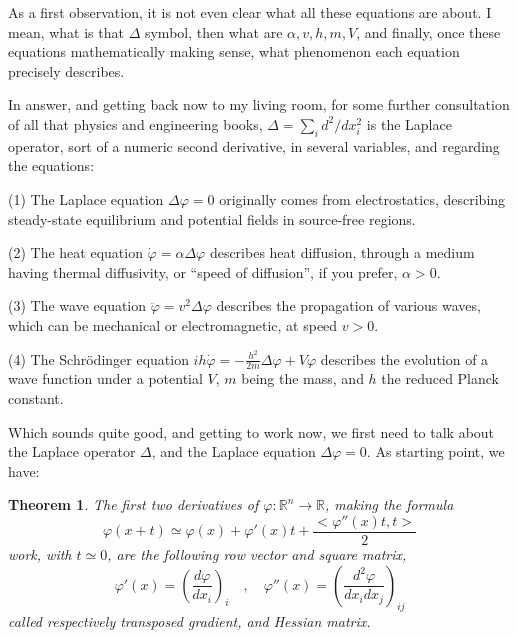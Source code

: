 \documentclass[12pt]{amsbook}
\newtheorem{theorem}{Theorem}[chapter]
\begin{document}
As a first observation, it is not even clear what all these equations are about. I mean, what is that $\Delta$ symbol, then what are $\alpha,v,h,m,V$, and finally, once these equations mathematically making sense, what phenomenon each equation precisely describes.

\bigskip

In answer, and getting back now to my living room, for some further consultation of all that physics and engineering books, $\Delta=\sum_id^2/dx_i^2$ is the Laplace operator, sort of a numeric second derivative, in several variables, and regarding the equations:

\bigskip

(1) The Laplace equation $\Delta\varphi=0$ originally comes from electrostatics, describing steady-state equilibrium and potential fields in source-free regions.

\bigskip

(2) The heat equation $\dot{\varphi}=\alpha\Delta\varphi$ describes heat diffusion, through a medium having thermal diffusivity, or ``speed of diffusion'', if you prefer, $\alpha>0$. 

\bigskip

(3) The wave equation $\ddot{\varphi}=v^2\Delta\varphi$ describes the propagation of various waves, which can be mechanical or electromagnetic, at speed $v>0$.

\bigskip

(4) The Schr\"odinger equation $ih\dot{\varphi}=-\frac{h^2}{2m}\Delta\varphi+V\varphi$ describes the evolution of a wave function under a potential $V$, $m$ being the mass, and $h$ the reduced Planck constant.

\bigskip

Which sounds quite good, and getting to work now, we first need to talk about the Laplace operator $\Delta$, and the Laplace equation $\Delta\varphi=0$. As starting point, we have:


\begin{theorem}
The first two derivatives of $\varphi:\mathbb R^n\to\mathbb R$, making the formula
$$\varphi(x+t)\simeq\varphi(x)+\varphi'(x)t+\frac{<\varphi''(x)t,t>}{2}$$
work, with $t\simeq0$, are the following row vector and square matrix,
$$\varphi'(x)=\left(\frac{d\varphi}{dx_i}\right)_i\quad,\quad 
\varphi''(x)=\left(\frac{d^2\varphi}{dx_idx_j}\right)_{ij}$$
called respectively transposed gradient, and Hessian matrix.
\end{theorem}
\end{document}

